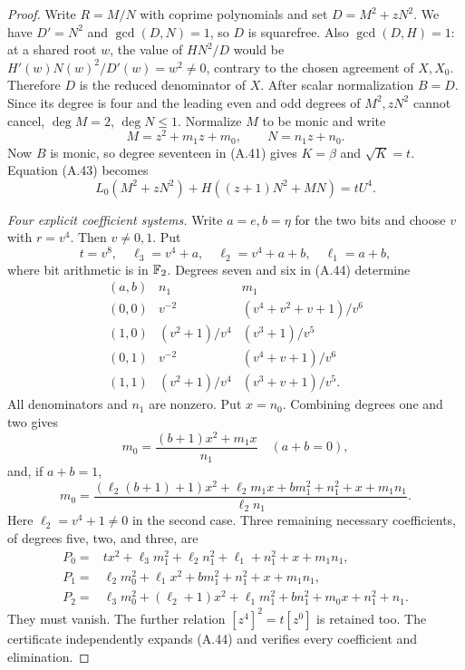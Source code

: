 \begin{proof}
Write $R=M/N$ with coprime polynomials and set
$D=M^2+zN^2$. We have $D'=N^2$ and $\gcd(D,N)=1$,
so $D$ is squarefree. Also $\gcd(D,H)=1$: at a shared
root $w$, the value of $HN^2/D$ would be
$H'(w)N(w)^2/D'(w)=w^2\ne0$, contrary to the chosen
agreement of $X,X_0$. Therefore $D$ is the reduced
denominator of $X$. After scalar normalization $B=D$.
Since its degree is four and the leading even and odd
degrees of $M^2,zN^2$ cannot cancel, $\deg M=2$,
$\deg N\le1$. Normalize $M$ to be monic and write
\[
 M=z^2+m_1z+m_0,\qquad N=n_1z+n_0.
\]
Now $B$ is monic, so degree seventeen in (A.41) gives
$K=\beta$ and $\sqrt K=t$. Equation (A.43) becomes
\[
 L_0(M^2+zN^2)+H((z+1)N^2+MN)=tU^4.                    \tag{A.44}
\]

\emph{Four explicit coefficient systems.}
Write $a=e,b=\eta$ for the two bits and choose $v$
with $r=v^4$. Then $v\ne0,1$. Put
\[
 t=v^8,\quad\ell_3=v^4+a,\quad
 \ell_2=v^4+a+b,\quad\ell_1=a+b,
\]
where bit arithmetic is in $\mathbb F_2$. Degrees seven and
six in (A.44) determine
\[
\begin{array}{c|c|c}
(a,b)&n_1&m_1\\\hline
(0,0)&v^{-2}&(v^4+v^2+v+1)/v^6\\
(1,0)&(v^2+1)/v^4&(v^3+1)/v^5\\
(0,1)&v^{-2}&(v^4+v+1)/v^6\\
(1,1)&(v^2+1)/v^4&(v^3+v+1)/v^5 .
\end{array}
\]
All denominators and $n_1$ are nonzero. Put $x=n_0$.
Combining degrees one and two gives
\[
 m_0=\frac{(b+1)x^2+m_1x}{n_1}\quad(a+b=0),
\]
and, if $a+b=1$,
\[
 m_0=\frac{(\ell_2(b+1)+1)x^2+\ell_2m_1x+
                 bm_1^2+n_1^2+x+m_1n_1}{\ell_2n_1}.
\]
Here $\ell_2=v^4+1\ne0$ in the second case. Three
remaining necessary coefficients, of degrees five,
two, and three, are
\[
\begin{aligned}
P_0={}&tx^2+\ell_3m_1^2+\ell_2n_1^2+
                             \ell_1+n_1^2+x+m_1n_1,\\
P_1={}&\ell_2m_0^2+\ell_1x^2+bm_1^2+
                                           n_1^2+x+m_1n_1,\\
P_2={}&\ell_3m_0^2+(\ell_2+1)x^2+\ell_1m_1^2+
                                  bn_1^2+m_0x+n_1^2+n_1.
\end{aligned}                                                     \tag{A.45}
\]
They must vanish. The further relation $[z^4]^2=t[z^0]$
is retained too. The certificate independently expands
(A.44) and verifies every coefficient and elimination.


\end{proof}
